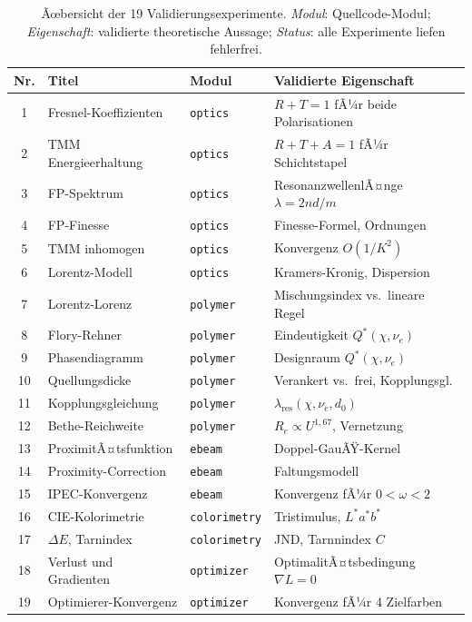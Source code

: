 ﻿\documentclass[a4paper,12pt]{article}
\theoremstyle{definition}
\begin{document}
	\begin{table}[htbp]
		\centering
		\caption{%
			Ãœbersicht der 19 Validierungsexperimente.
			\emph{Modul}: Quellcode-Modul; \emph{Eigenschaft}: validierte
			theoretische Aussage; \emph{Status}: alle Experimente liefen
			fehlerfrei.
		}
		\label{tab:validierung}
		\small
		\begin{tabular}{clll}
			\toprule
			\textbf{Nr.} & \textbf{Titel} & \textbf{Modul} & \textbf{Validierte Eigenschaft} \\
			\midrule
			1  & Fresnel-Koeffizienten    & \texttt{optics}     & $R+T=1$ fÃ¼r beide Polarisationen \\
			2  & TMM Energieerhaltung     & \texttt{optics}     & $R+T+A=1$ fÃ¼r Schichtstapel \\
			3  & FP-Spektrum              & \texttt{optics}     & ResonanzwellenlÃ¤nge $\lambda=2nd/m$ \\
			4  & FP-Finesse               & \texttt{optics}     & Finesse-Formel, Ordnungen \\
			5  & TMM inhomogen            & \texttt{optics}     & Konvergenz $O(1/K^2)$ \\
			6  & Lorentz-Modell           & \texttt{optics}     & Kramers-Kronig, Dispersion \\
			7  & Lorentz-Lorenz           & \texttt{polymer}    & Mischungsindex vs.\ lineare Regel \\
			8  & Flory-Rehner             & \texttt{polymer}    & Eindeutigkeit $Q^*(\chi,\nu_e)$ \\
			9  & Phasendiagramm           & \texttt{polymer}    & Designraum $Q^*(\chi,\nu_e)$ \\
			10 & Quellungsdicke           & \texttt{polymer}    & Verankert vs.\ frei, Kopplungsgl. \\
			11 & Kopplungsgleichung       & \texttt{polymer}    & $\lambda_\mathrm{res}(\chi,\nu_e,d_0)$ \\
			12 & Bethe-Reichweite         & \texttt{polymer}    & $R_e \propto U^{1{,}67}$, Vernetzung \\
			13 & ProximitÃ¤tsfunktion      & \texttt{ebeam}      & Doppel-GauÃŸ-Kernel \\
			14 & Proximity-Correction     & \texttt{ebeam}      & Faltungsmodell \\
			15 & IPEC-Konvergenz          & \texttt{ebeam}      & Konvergenz fÃ¼r $0<\omega<2$ \\
			16 & CIE-Kolorimetrie         & \texttt{colorimetry}& Tristimulus, $L^*a^*b^*$ \\
			17 & $\Delta E$, Tarnindex    & \texttt{colorimetry}& JND, Tarnnindex $C$ \\
			18 & Verlust und Gradienten   & \texttt{optimizer}  & OptimalitÃ¤tsbedingung $\nabla L=0$ \\
			19 & Optimierer-Konvergenz    & \texttt{optimizer}  & Konvergenz fÃ¼r 4 Zielfarben \\
			\bottomrule
		\end{tabular}
	\end{table}
	
\end{document}

